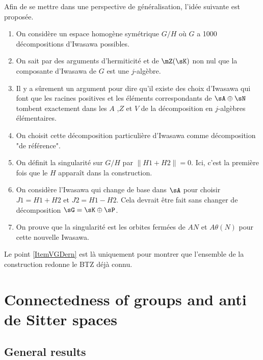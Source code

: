 Afin de se mettre dans une perspective de généralisation, l'idée suivante est proposée.

\begin{enumerate}

	\item
		


On considère un espace homogène symétrique $G/H$ où $G$ a 1000 décompositions d'Iwasawa possibles.

\item
 On sait par des arguments d'hermiticité et de $\mZ(\sK)$ non nul que la composante d'Iwasawa de $G$ est une $j$-algèbre.

\item
Il y a sûrement un argument pour dire qu'il existe des choix d'Iwasawa qui font que les racines positives et les éléments correspondants de $\sA\oplus\sN$ tombent exactement dans les $A$ ,$Z$ et $V $ de la décomposition en $j$-algèbres élémentaires.

\item
On choisit cette décomposition particulière d'Iwasawa comme décomposition "de référence".

\item
 On définit la singularité sur $G/H$ par $\| H1+H2\|=0$. Ici, c'est la première fois que le $H$ apparaît dans la construction.

 \item
 On considère l'Iwasawa qui change de base dans $\sA$ pour choisir $J1=H1+H2$ et $J2=H1-H2$. Cela devrait être fait sans changer de décomposition $\sG=\sK\oplus\sP$.

\item		\label{ItemVGDern}
 On prouve que la singularité est les orbites fermées de $AN$ et $A\theta(N)$ pour cette nouvelle Iwasawa.
\end{enumerate}


Le point \ref{ItemVGDern} est là uniquement pour montrer que l'ensemble de la construction redonne le BTZ déjà connu.

\section{Connectedness of groups and anti de Sitter spaces}

\subsection{General results}

